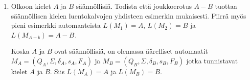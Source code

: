 \documentclass[a4paper,11pt,draft]{article}
\newcommand{\set}[1]{{\left\{ #1 \right\}}}
\newenvironment{automata}[1][2.8]%
{\begin{tikzpicture}[->,>=stealth',shorten >=1pt,auto,node distance=#1cm,semithick]}%
{\end{tikzpicture}}
\begin{document}
\begin{enumerate}

\item
  Olkoon kielet $A$ ja $B$ säännöllisiä. Todista että joukkoerotus $A
  - B$ tuottaa säännöllisen kielen luentokalvojen yhdisteen esimerkin
  mukaisesti. Piirrä myös pieni esimerkki automaateista $L(M_1)=A$,
  $L(M_2)= B$ ja $L(M_{A-b})=A-B$.

  Koska $A$ ja $B$ ovat säännöllisiä, on olemassa äärelliset
  automaatit $M_A = (Q_A, \Sigma, \delta_A, s_A, F_A)$ ja $M_B = (Q_B,
  \Sigma, \delta_B, s_B, F_B)$ jotka tunnistavat kielet $A$ ja $B$.
  Siis $L(M_A) = A$ ja $L(M_B) = B$.


\end{enumerate}
\end{document}
